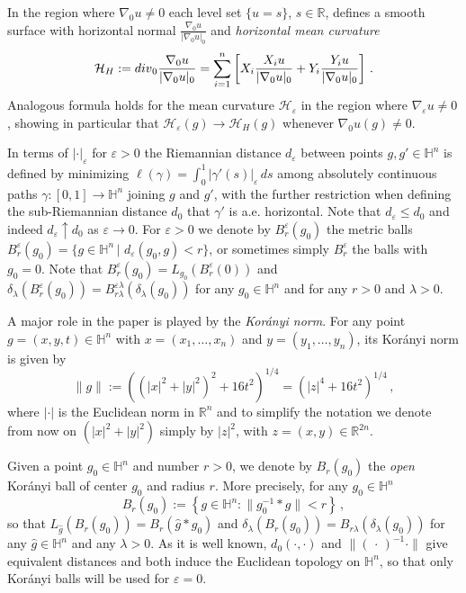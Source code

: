 \documentclass[10pt]{amsart}
\numberwithin{equation}{section}
\theoremstyle{definition}
\newcommand{\He}{\mathbb{H}}
\begin{document}
In the region where $\nabla_0 u \neq 0$ each level set $\{ u=s\}$, $s \in \mathbb{R}$, defines a smooth surface with horizontal normal $\frac{\nabla_0 u}{|\nabla_0 u|_0}$ and {\em horizontal mean curvature} 
\begin{equation}
\label{h-meancurvature}
\mathcal{H}_H:={\rm div}_0 \frac{\nabla_0 u}{|\nabla_0 u|_0}= \sum_{i=1}^n \left [X_i  \frac{X_i u}{|\nabla_0 u|_0}+  Y_i  \frac{Y_i u}{|\nabla_0 u|_0} \right] \, .
\end{equation}
Analogous formula holds for the mean curvature $\mathcal{H}_\varepsilon$ in the region where $\nabla_\varepsilon u \neq 0$, showing in particular that $\mathcal{H}_\varepsilon(g) \to \mathcal{H}_H(g)$ whenever $\nabla_0 u (g) \neq 0$.

In terms of $| \cdot |_\varepsilon$ for $\varepsilon>0$ the Riemannian distance $d_\varepsilon$ between points $g, g' \in \He^n$ is defined by minimizing $\ell(\gamma)=\int_0^1 |\gamma'(s)|_\varepsilon \,ds$ among absolutely continuous paths $\gamma: [0,1] \to \He^n$ joining $g$ and $g'$, with the further restriction when defining the sub-Riemannian distance $d_0$ that $\gamma'$ is a.e. horizontal. Note that $d_\varepsilon \leq d_0$ and indeed $d_\varepsilon \uparrow d_0$ as $\varepsilon \to 0$. For $\varepsilon>0$ we denote by $B^\varepsilon_r(g_0)$ the metric balls $B^\varepsilon_r(g_0)= \{ g \in \He^n \,| \, \, d_\varepsilon(g_0,g)<r\}$, or sometimes simply $B_r^\varepsilon$ the balls with $g_0=0$. 
Note that $B^\varepsilon_r(g_0)=L_{g_0}(B^\varepsilon_r(0))$ and $\delta_\lambda(B^\varepsilon_r(g_0))=B^{\varepsilon \lambda}_{r \lambda}(\delta_\lambda(g_0))$ for any $g_0 \in \He^n$ and for any $r>0$ and $\lambda>0$.


A major role in the paper is played by the {\it Kor\'{a}nyi norm}. For any point $g = (x, y, t) \in \He^n$ with $x = (x_1, \ldots, x_n)$ and $y = (y_1, \ldots, y_n)$,
its Kor\'{a}nyi norm is given by
$$
\|g\| := \left( (|x|^2 + |y|^2)^2 + 16t^2 \right)^{1/4} =\left( |z|^4 + 16t^2 \right)^{1/4}\, ,
$$
where $|\cdot|$ is the Euclidean norm in $\mathbb{R}^n$ and to simplify the notation we denote from now on $(|x|^2+|y|^2)$ simply by $|z|^2$, with $z=(x,y) \in \mathbb{R}^{2n}$.


Given a point $g_0 \in \He^n$ and number $r>0$, we denote by
$B_r(g_0)$ the {\it open} Kor\'{a}nyi ball of center $g_0$ and radius $r$.
More precisely, for any $g_0 \in \mathbb{H}^n$
$$B_r(g_0) := \left\{ g \in \He^n: \|g_{0}^{-1} \ast g\| < r\right\} \, ,$$
so that $L_{\hat{g}} (B_r(g_0))=B_r(\hat{g}*g_0)$ and $\delta_\lambda(B_r(g_0))=B_{r \lambda}(\delta_\lambda(g_0))$ for any $\hat{g} \in \He^n$ and any $\lambda>0$. As it is well known, $d_0(\cdot, \cdot)$ and $\| (\, \cdot \, )^{-1}  \cdot  \|$ give equivalent distances and both induce the Euclidean topology on $\He^n$, so that only Kor\'{a}nyi balls will be used for $\varepsilon=0$.
\end{document}
